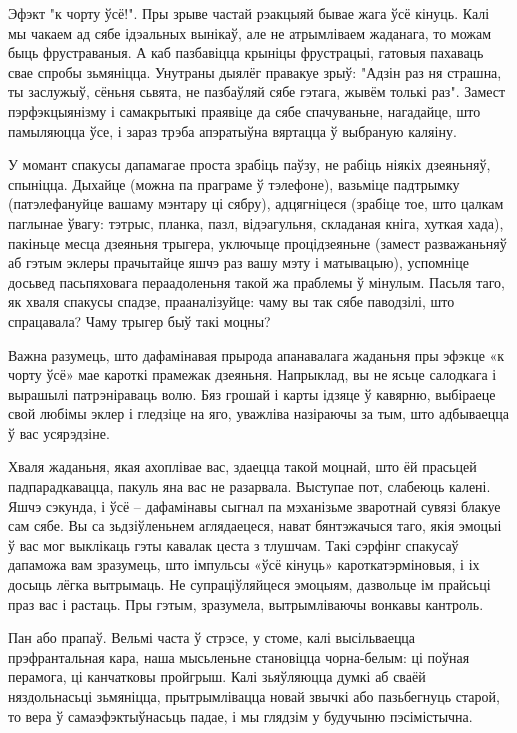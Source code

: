 Эфэкт "к чорту ўсё!". Пры зрыве частай рэакцыяй бывае жага ўсё кінуць. Калі мы чакаем ад сябе ідэальных вынікаў, але не атрымліваем жаданага, то можам быць фрустраваныя. А каб пазбавіцца крыніцы фрустрацыі, гатовыя пахаваць свае спробы зьмяніцца. Унутраны дыялёг правакуе зрыў: "Адзін раз ня страшна, ты заслужыў, сёньня сьвята, не пазбаўляй сябе гэтага, жывём толькі раз". Замест пэрфэкцыянізму і самакрытыкі праявіце да сябе спачуваньне, нагадайце, што памыляюцца ўсе, і зараз трэба апэратыўна вяртацца ў выбраную каляіну.

У момант спакусы дапамагае проста зрабіць паўзу, не рабіць ніякіх дзеяньняў, спыніцца. Дыхайце (можна па праграме ў тэлефоне), вазьміце падтрымку (патэлефануйце вашаму мэнтару ці сябру), адцягніцеся (зрабіце тое, што цалкам паглынае ўвагу: тэтрыс, планка, пазл, відэагульня, складаная кніга, хуткая хада), пакіньце месца дзеяньня трыгера, уключыце процідзеяньне (замест разважаньняў аб гэтым эклеры прачытайце яшчэ раз вашу мэту і матывацыю), успомніце досьвед пасьпяховага пераадоленьня такой жа праблемы ў мінулым. Пасьля таго, як хваля спакусы спадзе, прааналізуйце: чаму вы так сябе паводзілі, што спрацавала? Чаму трыгер быў такі моцны?

Важна разумець, што дафамінавая прырода апанавалага жаданьня пры эфэкце «к чорту ўсё» мае кароткі прамежак дзеяньня. Напрыклад, вы не ясьце салодкага і вырашылі патрэніраваць волю. Бяз грошай і карты ідзяце ў кавярню, выбіраеце свой любімы эклер і гледзіце на яго, уважліва назіраючы за тым, што адбываецца ў вас усярэдзіне.

Хваля жаданьня, якая ахоплівае вас, здаецца такой моцнай, што ёй прасьцей падпарадкавацца, пакуль яна вас не разарвала. Выступае пот, слабеюць калені. Яшчэ сэкунда, і ўсё – дафамінавы сыгнал па мэханізьме зваротнай сувязі блакуе сам сябе. Вы са зьдзіўленьнем аглядаецеся, нават бянтэжачыся таго, якія эмоцыі ў вас мог выклікаць гэты кавалак цеста з тлушчам. Такі сэрфінг спакусаў дапаможа вам зразумець, што імпульсы «ўсё кінуць» кароткатэрміновыя, і іх досыць лёгка вытрымаць. Не супраціўляйцеся эмоцыям, дазвольце ім прайсьці праз вас і растаць. Пры гэтым, зразумела, вытрымліваючы вонкавы кантроль.

Пан або прапаў. Вельмі часта ў стрэсе, у стоме, калі высільваецца прэфрантальная кара, наша мысьленьне становіцца чорна-белым: ці поўная перамога, ці канчатковы пройгрыш. Калі зьяўляюцца думкі аб сваёй няздольнасьці зьмяніцца, прытрымлівацца новай звычкі або пазьбегнуць старой, то вера ў самаэфэктыўнасьць падае, і мы глядзім у будучыню пэсімістычна.

